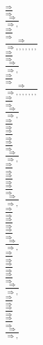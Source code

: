 \documentclass[11pt]{article}
\begin{document}
\begin{center}
\bigskip
\\$\frac{\Rightarrow }{\Rightarrow }$
\bigskip
\\$\frac{\Rightarrow }{\Rightarrow , }$
\bigskip
\\$\frac{\Rightarrow }{\Rightarrow }$
\bigskip
\\$\frac{\Rightarrow }{\Rightarrow , , , , , , , }$
\bigskip
\\$\frac{\Rightarrow }{\Rightarrow }$
\bigskip
\\$\frac{\Rightarrow }{\Rightarrow , }$
\bigskip
\\$\frac{\Rightarrow }{\Rightarrow }$
\bigskip
\\$\frac{\Rightarrow }{\Rightarrow , , , , , , , }$
\bigskip
\\$\frac{\Rightarrow }{\Rightarrow }$
\bigskip
\\$\frac{\Rightarrow }{\Rightarrow , }$
\bigskip
\\$\frac{\Rightarrow }{\Rightarrow }$
\bigskip
\\$\frac{\Rightarrow }{\Rightarrow }$
\bigskip
\\$\frac{\Rightarrow }{\Rightarrow }$
\bigskip
\\$\frac{\Rightarrow }{\Rightarrow , }$
\bigskip
\\$\frac{\Rightarrow }{\Rightarrow }$
\bigskip
\\$\frac{\Rightarrow }{\Rightarrow }$
\bigskip
\\$\frac{\Rightarrow }{\Rightarrow }$
\bigskip
\\$\frac{\Rightarrow }{\Rightarrow , }$
\bigskip
\\$\frac{\Rightarrow }{\Rightarrow }$
\bigskip
\\$\frac{\Rightarrow }{\Rightarrow }$
\bigskip
\\$\frac{\Rightarrow }{\Rightarrow }$
\bigskip
\\$\frac{\Rightarrow }{\Rightarrow , }$
\bigskip
\\$\frac{\Rightarrow }{\Rightarrow }$
\bigskip
\\$\frac{\Rightarrow }{\Rightarrow }$
\bigskip
\\$\frac{\Rightarrow }{\Rightarrow }$
\bigskip
\\$\frac{\Rightarrow }{\Rightarrow , }$
\bigskip
\\$\frac{\Rightarrow }{\Rightarrow }$
\bigskip
\\$\frac{\Rightarrow }{\Rightarrow }$
\bigskip
\\$\frac{\Rightarrow }{\Rightarrow }$
\bigskip
\\$\frac{\Rightarrow }{\Rightarrow , }$

\end{center}
\end{document}
